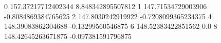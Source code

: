 0 157.37217712402344 8.848342895507812
1 147.71534729003906 -0.8084869384765625
2 147.8030242919922 -0.7208099365234375
4 148.39083862304688 -0.13299560546875
6 148.52383422851562 0.0
8 148.42645263671875 -0.097381591796875

